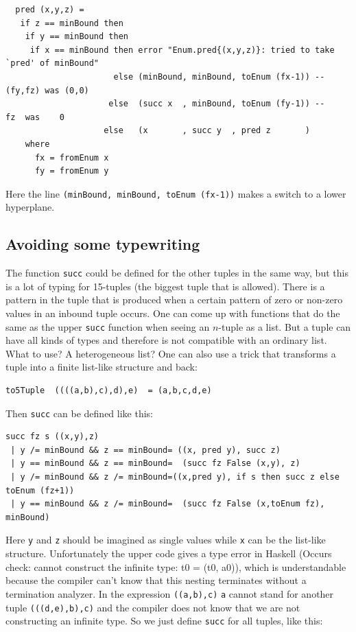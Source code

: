 \documentclass{tmr}
\begin{document}
\begin{Verbatim}
  pred (x,y,z) =
   if z == minBound then
    if y == minBound then
     if x == minBound then error "Enum.pred{(x,y,z)}: tried to take `pred' of minBound"
                      else (minBound, minBound, toEnum (fx-1)) -- (fy,fz) was (0,0)
                     else  (succ x  , minBound, toEnum (fy-1)) --     fz  was    0
                    else   (x       , succ y  , pred z       )
    where
      fx = fromEnum x
      fy = fromEnum y
\end{Verbatim}
Here the line \verb|(minBound, minBound, toEnum (fx-1))| makes a switch to a lower hyperplane.

\subsection{Avoiding some typewriting}

The function \verb|succ| could be defined for the other tuples in the same way, but this is a lot of typing for 15-tuples (the biggest tuple that is allowed). 
There is a pattern in the tuple that is produced when a certain pattern of zero or non-zero values in an inbound tuple occurs.
One can come up with functions that do the same as the upper \verb|succ| function when seeing an $n$-tuple as a list.
But a tuple can have all kinds of types and therefore is not compatible with an ordinary list. What to use? A heterogeneous list? One can also use a trick that transforms a tuple into a finite list-like structure and back:

\begin{Verbatim}
to5Tuple  ((((a,b),c),d),e)  = (a,b,c,d,e)
\end{Verbatim}

Then \verb|succ| can be defined like this:
\begin{Verbatim}
succ fz s ((x,y),z)
 | y /= minBound && z == minBound= ((x, pred y), succ z)
 | y == minBound && z == minBound=  (succ fz False (x,y), z)
 | y /= minBound && z /= minBound=((x,pred y), if s then succ z else toEnum (fz+1))
 | y == minBound && z /= minBound=  (succ fz False (x,toEnum fz), minBound)
\end{Verbatim}
Here \verb|y| and \verb|z| should be imagined as single values while \verb|x| can be the list-like structure. 
Unfortunately the upper code gives a type error in Haskell (Occurs check: cannot construct the infinite type: t0 = (t0, a0)), which is understandable because the compiler can't know that this nesting terminates without a termination analyzer. In the expression \verb|((a,b),c)|  \verb|a| cannot stand for another tuple \eg \verb|(((d,e),b),c)| and the compiler does not know that we are not constructing an infinite type.
So we just define \verb|succ| for all tuples, like this:
\end{document}
